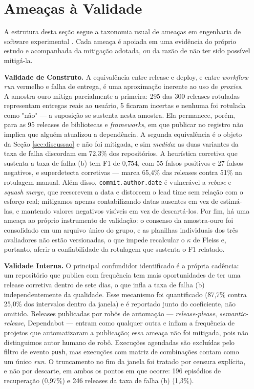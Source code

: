 \section{Ameaças à Validade}
\label{sec:ameacas}

A estrutura desta seção segue a taxonomia usual de ameaças em engenharia de software
experimental \cite{wohlin2012}. Cada ameaça é apoiada em uma evidência do próprio estudo e
acompanhada da mitigação adotada, ou da razão de não ter sido possível mitigá-la.

\textbf{Validade de Construto.} A equivalência entre release e deploy, e entre
\emph{workflow run} vermelho e falha de entrega, é uma aproximação inerente ao uso de
\emph{proxies}. A amostra-ouro mitiga parcialmente a primeira: 295 das 300 releases
rotuladas representam entregas reais ao usuário, 5 ficaram incertas e nenhuma foi rotulada
como "não" --- a suposição se sustenta nesta amostra. Ela permanece, porém, para as 95
releases de bibliotecas e \emph{frameworks}, em que publicar no registro não implica que
alguém atualizou a dependência. A segunda equivalência é o objeto da Seção
\ref{sec:discussao} e não foi mitigada, e sim \emph{medida}: as duas variantes da taxa de falha
discordam em 72,3\% dos repositórios. A heurística corretiva que sustenta a taxa de falha (b) tem
F1 de 0,754, com 55 falsos positivos e 27 falsos negativos, e superdetecta corretivas ---
marca 65,4\% das releases contra 51\% na rotulagem manual. Além disso,
\texttt{commit.author.date} é vulnerável a \emph{rebase} e \emph{squash merge}, que reescrevem
a data e distorcem o lead time sem relação com o esforço real; mitigamos apenas
contabilizando datas ausentes em vez de estimá-las, e mantendo valores negativos visíveis em
vez de descartá-los. Por fim, há uma ameaça ao próprio instrumento de validação: o consenso
da amostra-ouro foi consolidado em um arquivo único do grupo, e as planilhas individuais dos
três avaliadores não estão versionadas, o que impede recalcular o $\kappa$ de Fleiss e,
portanto, aferir a confiabilidade da rotulagem que sustenta o F1 relatado.

\textbf{Validade Interna.} O principal confundidor identificado é a própria cadência: um
repositório que publica com frequência tem mais oportunidades de ter uma release corretiva
dentro de sete dias, o que infla a taxa de falha (b) independentemente da qualidade. Esse mecanismo
foi quantificado (87,7\% contra 25,0\% dos intervalos dentro da janela) e é reportado junto
do coeficiente, não omitido. Releases publicadas por robôs de automação ---
\emph{release-please}, \emph{semantic-release}, Dependabot --- entram como qualquer outra e
inflam a frequência de projetos que automatizaram a publicação; essa ameaça não foi mitigada,
pois não distinguimos autor humano de robô. Execuções agendadas são excluídas pelo filtro de
evento \texttt{push}, mas execuções com matriz de combinações contam como um único
\emph{run}. O truncamento no fim da janela foi tratado por censura explícita, e não por
descarte, em ambos os pontos em que ocorre: 196 episódios de recuperação (0,97\%) e 246
releases da taxa de falha (b) (1,3\%).

